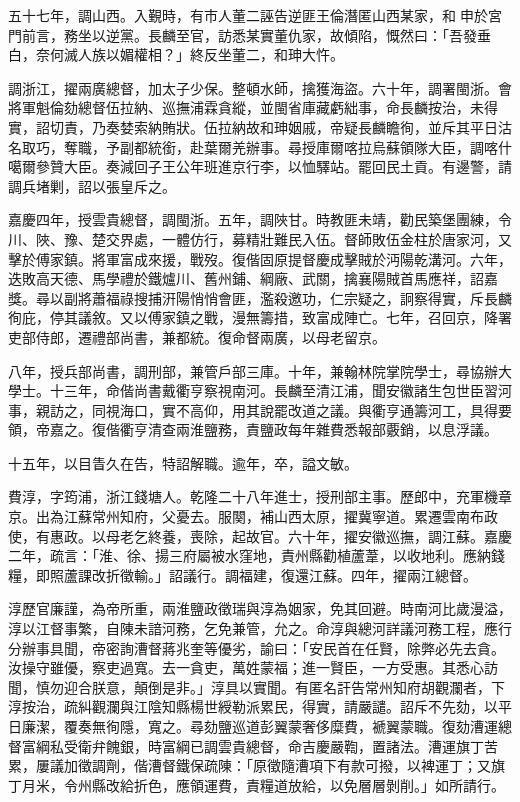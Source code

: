 \begin{pinyinscope}
五十七年，調山西。入覲時，有市人董二誣告逆匪王倫潛匿山西某家，和申於宮門前言，務坐以逆黨。長麟至官，訪悉某實董仇家，故傾陷，慨然曰：「吾發垂白，奈何滅人族以媚權相？」終反坐董二，和珅大忤。

調浙江，擢兩廣總督，加太子少保。整頓水師，擒獲海盜。六十年，調署閩浙。會將軍魁倫劾總督伍拉納、巡撫浦霖貪縱，並閩省庫藏虧絀事，命長麟按治，未得實，詔切責，乃奏婪索納賄狀。伍拉納故和珅姻戚，帝疑長麟瞻徇，並斥其平日沽名取巧，奪職，予副都統銜，赴葉爾羌辦事。尋授庫爾喀拉烏蘇領隊大臣，調喀什噶爾參贊大臣。奏減回子王公年班進京行李，以恤驛站。罷回民土貢。有邊警，請調兵堵剿，詔以張皇斥之。

嘉慶四年，授雲貴總督，調閩浙。五年，調陜甘。時教匪未靖，勸民築堡團練，令川、陜、豫、楚交界處，一體仿行，募精壯難民入伍。督師敗伍金柱於唐家河，又擊於傅家鎮。將軍富成來援，戰歿。復偕固原提督慶成擊賊於沔陽乾溝河。六年，迭敗高天德、馬學禮於鐵爐川、舊州鋪、綱廠、武關，擒襄陽賊首馬應祥，詔嘉獎。尋以副將蕭福祿搜捕汧陽悄悄會匪，濫殺邀功，仁宗疑之，詗察得實，斥長麟徇庇，停其議敘。又以傅家鎮之戰，漫無籌措，致富成陣亡。七年，召回京，降署吏部侍郎，遷禮部尚書，兼都統。復命督兩廣，以母老留京。

八年，授兵部尚書，調刑部，兼管戶部三庫。十年，兼翰林院掌院學士，尋協辦大學士。十三年，命偕尚書戴衢亨察視南河。長麟至清江浦，聞安徽諸生包世臣習河事，親訪之，同視海口，實不高仰，用其說罷改道之議。與衢亨通籌河工，具得要領，帝嘉之。復偕衢亨清查兩淮鹽務，責鹽政每年雜費悉報部覈銷，以息浮議。

十五年，以目眚久在告，特詔解職。逾年，卒，謚文敏。

費淳，字筠浦，浙江錢塘人。乾隆二十八年進士，授刑部主事。歷郎中，充軍機章京。出為江蘇常州知府，父憂去。服闋，補山西太原，擢冀寧道。累遷雲南布政使，有惠政。以母老乞終養，喪除，起故官。六十年，擢安徽巡撫，調江蘇。嘉慶二年，疏言：「淮、徐、揚三府屬被水窪地，責州縣勸植蘆葦，以收地利。應納錢糧，即照蘆課改折徵輸。」詔議行。調福建，復還江蘇。四年，擢兩江總督。

淳歷官廉謹，為帝所重，兩淮鹽政徵瑞與淳為姻家，免其回避。時南河比歲漫溢，淳以江督事繁，自陳未諳河務，乞免兼管，允之。命淳與總河詳議河務工程，應行分辦事具聞，帝密詢漕督蔣兆奎等優劣，諭曰：「安民首在任賢，除弊必先去貪。汝操守雖優，察吏過寬。去一貪吏，萬姓蒙福；進一賢臣，一方受惠。其悉心訪聞，慎勿迎合朕意，顛倒是非。」淳具以實聞。有匿名訐告常州知府胡觀瀾者，下淳按治，疏糾觀瀾與江陰知縣楊世綬勒派累民，得實，請嚴譴。詔斥不先劾，以平日廉潔，覆奏無徇隱，寬之。尋劾鹽巡道彭翼蒙奢侈糜費，褫翼蒙職。復劾漕運總督富綱私受衛弁餽銀，時富綱已調雲貴總督，命吉慶嚴鞫，置諸法。漕運旗丁苦累，屢議加徵調劑，偕漕督鐵保疏陳：「原徵隨漕項下有款可撥，以裨運丁；又旗丁月米，令州縣改給折色，應領運費，責糧道放給，以免層層剝削。」如所請行。


\end{pinyinscope}
